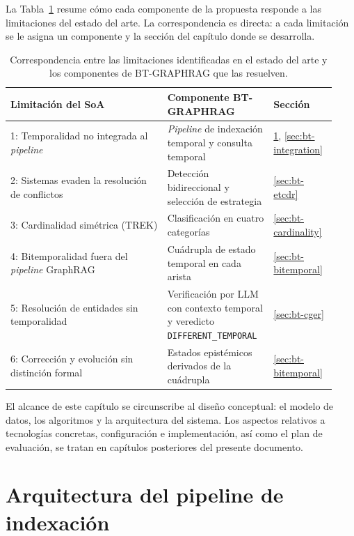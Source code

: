 
La Tabla~\ref{tab:limitations-to-components} resume cómo cada componente de la propuesta responde a las limitaciones del estado del arte. La correspondencia es directa: a cada limitación se le asigna un componente y la sección del capítulo donde se desarrolla.

\begin{table}[h]
\centering
\small
\begin{tabular}{p{0.45\linewidth}p{0.30\linewidth}p{0.18\linewidth}}
\hline
\textbf{Limitación del SoA} & \textbf{Componente BT-GRAPHRAG} & \textbf{Sección} \\ \hline
1: Temporalidad no integrada al \emph{pipeline} & \emph{Pipeline} de indexación temporal y consulta temporal & \ref{sec:bt-pipeline}, \ref{sec:bt-integration} \\
2: Sistemas evaden la resolución de conflictos & Detección bidireccional y selección de estrategia & \ref{sec:bt-etcdr} \\
3: Cardinalidad simétrica (TREK) & Clasificación en cuatro categorías & \ref{sec:bt-cardinality} \\
4: Bitemporalidad fuera del \emph{pipeline} GraphRAG & Cuádrupla de estado temporal en cada arista & \ref{sec:bt-bitemporal} \\
5: Resolución de entidades sin temporalidad & Verificación por LLM con contexto temporal y veredicto \texttt{DIFFERENT\_TEMPORAL} & \ref{sec:bt-cger} \\
6: Corrección y evolución sin distinción formal & Estados epistémicos derivados de la cuádrupla & \ref{sec:bt-bitemporal} \\ \hline
\end{tabular}
\caption{Correspondencia entre las limitaciones identificadas en el estado del arte y los componentes de BT-GRAPHRAG que las resuelven.}
\label{tab:limitations-to-components}
\end{table}

El alcance de este capítulo se circunscribe al diseño conceptual: el modelo de datos, los algoritmos y la arquitectura del sistema. Los aspectos relativos a tecnologías concretas, configuración e implementación, así como el plan de evaluación, se tratan en capítulos posteriores del presente documento.

\section{Arquitectura del pipeline de indexación}\label{sec:bt-pipeline}

